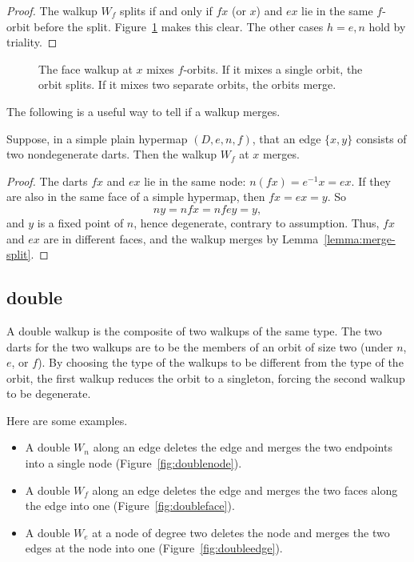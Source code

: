 \begin{proof} The walkup $W_f$ splits if and only if $f x$ 
(or $x$)
and $e x$ lie in the same $f$-orbit before the split. 
Figure~\ref{fig:split} makes this clear.
The other cases $h=e,n$ hold by triality.
\end{proof}


\begin{figure}[htb]
\centering
{}
\caption{The face walkup at $x$ mixes $f$-orbits.  If it mixes a
single orbit, the orbit splits. If it mixes two separate orbits, the
orbits merge. }
\label{fig:split}
\end{figure}

The following is a useful way to tell if a walkup merges.


\begin{lemma}  
Suppose, in a simple plain hypermap $(D,e,n,f)$, that an edge $\{x,y\}$ consists
of two nondegenerate darts.  Then the walkup $W_f$ 
at $x$ merges.
\end{lemma}
%

\begin{proof} 
The darts $f x$ and $e x$ lie in the same node: $n (f x) = e^{-1} x
= e x$. If they are also in the same face of a simple hypermap, then
$f x = e x = y$. So
\begin{displaymath}n y  = n f x = n f e y = y,\end{displaymath}
and $y$ is a fixed
point of $n$, hence degenerate, contrary to assumption.  
Thus, $f x$ and $e x$ are in different faces, and the walkup merges
by Lemma~\ref{lemma:merge-split}.  
\end{proof}


\subsection{double}
%

A double walkup is the composite of two walkups of the same type.  The
two darts for the two walkups are to be the members of an orbit of
size two (under $n$, $e$, or $f$).
By choosing the type of the walkups to be different from the type of
the orbit, the first walkup reduces the orbit to a singleton, forcing
the second walkup to be degenerate.

Here are some examples.
\begin{itemize}
\item A double $W_n$ along an edge deletes the edge and 
merges the two endpoints into
a single node (Figure~\ref{fig:doublenode}). 
\item A double $W_f$ along an edge 
deletes the edge and merges the two faces along the edge into
one (Figure~\ref{fig:doubleface}).
\item A double $W_e$ at a node of degree two
deletes the node and merges the two edges at the node into
one (Figure~\ref{fig:doubleedge}).
\end{itemize}


